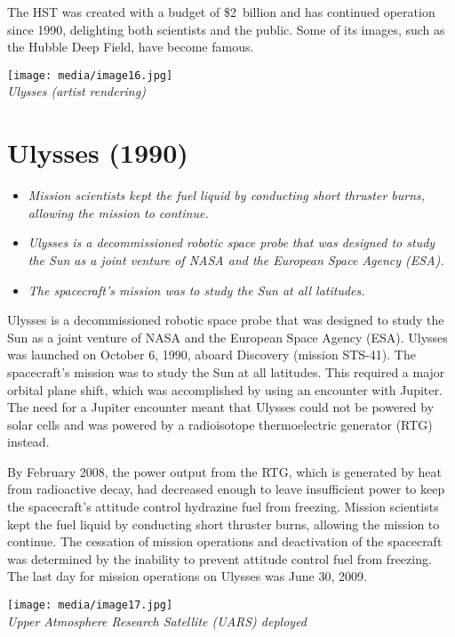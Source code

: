 The HST was created with a budget of \$2~billion and has continued
operation since 1990, delighting both scientists and the public. Some of
its images, such as the Hubble Deep Field, have become famous.

\texttt{[image: media/image16.jpg]}\\
\emph{Ulysses (artist rendering)}

\section{Ulysses (1990)}\label{ulysses-1990}

\begin{itemize}
\item
  \emph{Mission scientists kept the fuel liquid by conducting short
  thruster burns, allowing the mission to continue.}
\item
  \emph{Ulysses is a decommissioned robotic space probe that was
  designed to study the Sun as a joint venture of NASA and the European
  Space Agency (ESA).}
\item
  \emph{The spacecraft's mission was to study the Sun at all latitudes.}
\end{itemize}

Ulysses is a decommissioned robotic space probe that was designed to
study the Sun as a joint venture of NASA and the European Space Agency
(ESA). Ulysses was launched on October 6, 1990, aboard Discovery
(mission STS-41). The spacecraft's mission was to study the Sun at all
latitudes. This required a major orbital plane shift, which was
accomplished by using an encounter with Jupiter. The need for a Jupiter
encounter meant that Ulysses could not be powered by solar cells and was
powered by a radioisotope thermoelectric generator (RTG) instead.

By February 2008, the power output from the RTG, which is generated by
heat from radioactive decay, had decreased enough to leave insufficient
power to keep the spacecraft's attitude control hydrazine fuel from
freezing. Mission scientists kept the fuel liquid by conducting short
thruster burns, allowing the mission to continue. The cessation of
mission operations and deactivation of the spacecraft was determined by
the inability to prevent attitude control fuel from freezing. The last
day for mission operations on Ulysses was June 30, 2009.

\texttt{[image: media/image17.jpg]}\\
\emph{Upper Atmosphere Research Satellite (UARS) deployed}

